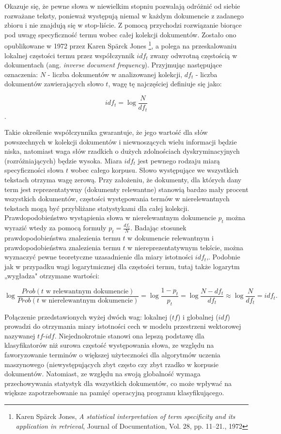 \documentclass{pracamgr}
\begin{document}
Okazuje się, że pewne słowa w niewielkim stopniu pozwalają odróżnić od siebie rozważane teksty, ponieważ występują niemal w każdym dokumencie z zadanego zbioru i nie znajdują się w stop-liście. Z pomocą przychodzi rozwiązanie biorące pod uwagę specyficzność termu wobec całej kolekcji dokumentów. Zostało ono opublikowane w 1972 przez Karen Spärck Jones \footnote{Karen Spärck Jones, \textit{A statistical interpretation of term specificity and its application in retrieval}, Journal of Documentation, Vol. 28, pp. 11–21., 1972}, a polega na przeskalowaniu lokalnej częstości termu przez współczynnik $idf_t$ zwany odwrotną częstością w dokumentach (ang. \textit{inverse document frequency}). Przyjmując następujące oznaczenia: $N$ - liczba dokumentów w analizowanej kolekcji, $ df_t $ - liczba dokumentów zawierających słowo $t$, wagę tę najczęściej definiuje się jako: 

\[ 
idf_t = \log\frac{N}{df_t}
\].

Takie określenie współczynnika gwarantuje, że jego wartość dla słów powszechnych w kolekcji dokumentów i niewnoszących wielu informacji będzie niska, natomiast waga słów rzadkich o dużych zdolnościach dyskryminacyjnych (rozróżniających) będzie wysoka. Miara $idf_t$ jest pewnego rodzaju miarą specyficzności słowa $t$ wobec całego korpusu. Słowo występujące we wszystkich tekstach otrzyma wagę zerową. 
Przy założeniu, że dokumenty, dla których dany term jest reprezentatywny (dokumenty relewantne) stanowią bardzo mały procent wszystkich dokumentów, częstości występowania termów w nierelewantnych tekstach mogą być przybliżane statystykami dla całej kolekcji. Prawdopodobieństwo wystąpienia słowa w nierelewantnym dokumencie $p_t$ można wyrazić wtedy za pomocą formuły $p_t = \frac{df_t}{N}$.  Badając stosunek prawdopodobieństwa znalezienia termu $t$ w dokumencie relewantnym i prawdopodobieństwa znalezienia termu $t$ w niereprezentatywnym tekście, można wyznaczyć pewne teoretyczne uzasadnienie dla miary istotności $idf_t$,. Podobnie jak w przypadku wagi logarytmicznej dla częstości termu, tutaj także logarytm „wygładza" otrzymane wartości:

\[
\log\frac{Prob(t \text{ w relewantnym dokumencie})}{Prob(t \text{ w nierelewantnym dokumencie})} = \log\frac{1 - p_t}{p_t} = \log\frac{N - df_t}{df_t} \approx \log\frac{N}{df_t} = idf_t.
\]

Połączenie przedstawionych wyżej dwóch wag: lokalnej ($tf$) i globalnej ($idf$) prowadzi do otrzymania miary istotności cech w modelu przestrzeni wektorowej nazywanej $tf \text{-} idf$. Niejednokrotnie stanowi ona lepszą podstawę dla klasyfikatorów niż surowa częstość występowania słowa, ze względu na faworyzowanie terminów o większej użyteczności dla algorytmów uczenia maszynowego (niewystępujących zbyt często czy zbyt rzadko w korpusie dokumentów. Natomiast, ze względu na swoją globalność wymaga przechowywania statystyk dla wszystkich dokumentów, co może wpływać na większe zapotrzebowanie na pamięć operacyjną programu klasyfikującego.
\end{document}
